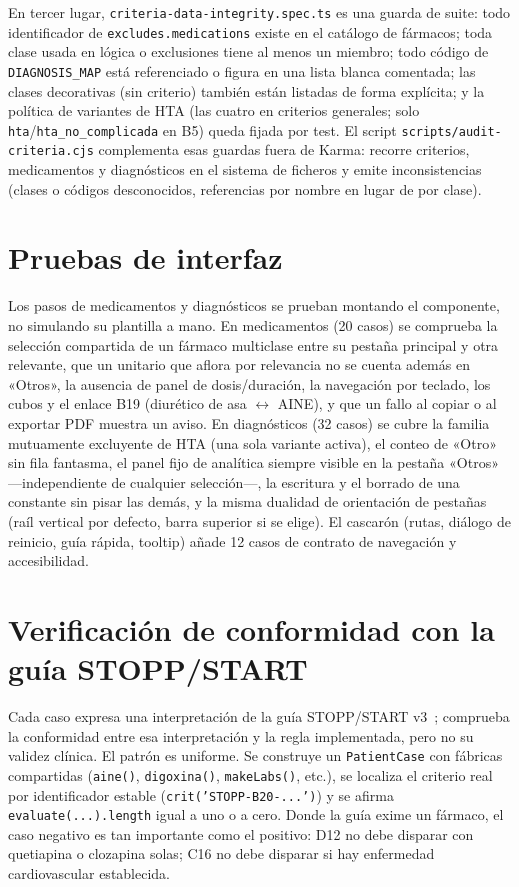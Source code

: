 En tercer lugar, \texttt{criteria-data-integrity.spec.ts} es una guarda de
suite: todo identificador de \texttt{excludes.medications} existe en el
catálogo de fármacos; toda clase usada en lógica o exclusiones tiene al
menos un miembro; todo código de \texttt{DIAGNOSIS\_MAP} está referenciado
o figura en una lista blanca comentada; las clases decorativas (sin
criterio) también están listadas de forma explícita; y la política de
variantes de HTA (las cuatro en criterios generales; solo
\texttt{hta}/\texttt{hta\_no\_complicada} en B5) queda fijada por test.
El script \texttt{scripts/audit-criteria.cjs} complementa esas guardas
fuera de Karma: recorre criterios, medicamentos y diagnósticos en el
sistema de ficheros y emite inconsistencias (clases o códigos
desconocidos, referencias por nombre en lugar de por clase).

\section{Pruebas de interfaz}

Los pasos de medicamentos y diagnósticos se prueban montando el
componente, no simulando su plantilla a mano. En medicamentos (20 casos)
se comprueba la selección compartida de un fármaco multiclase entre su
pestaña principal y otra relevante, que un unitario que aflora por
relevancia no se cuenta además en «Otros», la ausencia de panel de
dosis/duración, la navegación por teclado, los cubos y el enlace B19
(diurético de asa $\leftrightarrow$ AINE), y que un fallo al copiar o al
exportar PDF muestra un aviso. En diagnósticos (32 casos) se cubre la
familia mutuamente excluyente de HTA (una sola variante activa), el conteo de «Otro» sin
fila fantasma, el panel fijo de analítica siempre visible en la pestaña
«Otros» ---independiente de cualquier selección---, la escritura y el
borrado de una constante sin pisar las demás, y la misma dualidad de
orientación de pestañas (raíl vertical por defecto, barra superior si se
elige). El cascarón (rutas, diálogo de reinicio, guía rápida, tooltip)
añade 12 casos de contrato de navegación y accesibilidad.

\section{Verificación de conformidad con la guía STOPP/START}
\label{sec:validacion-clinica}

Cada caso expresa una interpretación de la guía STOPP/START
v3~\cite{omahony2023stopp,sacyl2023stopp}; comprueba la conformidad entre
esa interpretación y la regla implementada, pero no su validez clínica.
El patrón es uniforme. Se construye un \texttt{PatientCase} con fábricas
compartidas (\texttt{aine()}, \texttt{digoxina()}, \texttt{makeLabs()},
etc.), se localiza el criterio real por identificador estable
(\texttt{crit('STOPP-B20-...')}) y se afirma \texttt{evaluate(...).length}
igual a uno o a cero. Donde la guía exime un fármaco, el caso negativo es
tan importante como el positivo: D12 no debe disparar con quetiapina o
clozapina solas; C16 no debe disparar si hay enfermedad cardiovascular
establecida.

